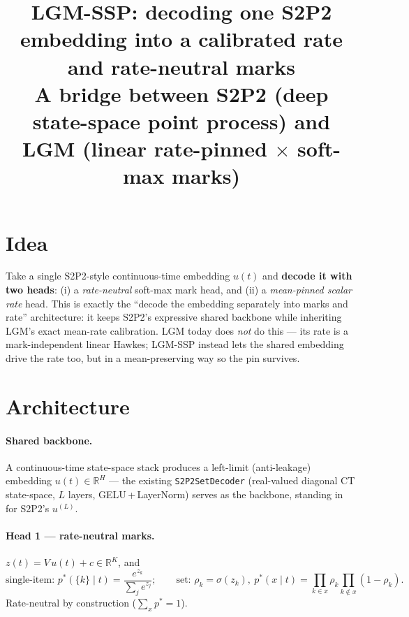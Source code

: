 \documentclass[11pt]{article}
\title{\textbf{LGM-SSP: decoding one S2P2 embedding into a calibrated rate and rate-neutral marks}\\[2pt]
\large A bridge between S2P2 (deep state-space point process) and LGM (linear rate-pinned $\times$ soft-max marks)}
\author{}\date{}
\newcommand{\R}{\mathbb{R}}
\begin{document}
\maketitle\vspace{-3em}

\section{Idea}
Take a single S2P2-style continuous-time embedding $u(t)$ and \textbf{decode it with two heads}:
(i) a \emph{rate-neutral} soft-max mark head, and (ii) a \emph{mean-pinned scalar rate} head. This is
exactly the ``decode the embedding separately into marks and rate'' architecture: it keeps S2P2's
expressive shared backbone while inheriting LGM's exact mean-rate calibration. LGM today does
\emph{not} do this --- its rate is a mark-independent linear Hawkes; LGM-SSP instead lets the shared
embedding drive the rate too, but in a mean-preserving way so the pin survives.

\section{Architecture}
\paragraph{Shared backbone.} A continuous-time state-space stack produces a left-limit
(anti-leakage) embedding $u(t)\in\R^{H}$ --- the existing \texttt{S2P2SetDecoder} (real-valued
diagonal CT state-space, $L$ layers, GELU\,+\,LayerNorm) serves as the backbone, standing in for
S2P2's $u^{(L)}$.
\paragraph{Head 1 --- rate-neutral marks.} $z(t)=V\,u(t)+c\in\R^{K}$, and
\[
\text{single-item: } p^*(\{k\}\mid t)=\frac{e^{z_k}}{\sum_j e^{z_j}};\qquad
\text{set: } \rho_k=\sigma(z_k),\ p^*(x\mid t)=\!\prod_{k\in x}\!\rho_k\!\prod_{k\notin x}\!(1-\rho_k).
\]
Rate-neutral by construction ($\sum_x p^*=1$).
\end{document}
